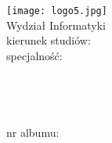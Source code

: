 %

\begingroup
\firaoldstyle  %
\centering %
\thispagestyle{empty} %

    \texttt{[image: logo5.jpg]}\\[.75cm]

Wydział Informatyki\\[.25cm]
kierunek studiów: \field\\[.25cm]
specjalność: \speciality\\[1.75cm]
{\Large \degreename}\\[1cm]

\Large {\bfseries \MakeUppercase  \ttitle }\\[.5cm]%
\large {\bfseries \MakeUppercase \ttitleEng} \\[.5cm]%

{\large \bfseries \authornames}\\[.5cm]
{nr albumu: \bfseries {\noalbum}}\\[1cm]

